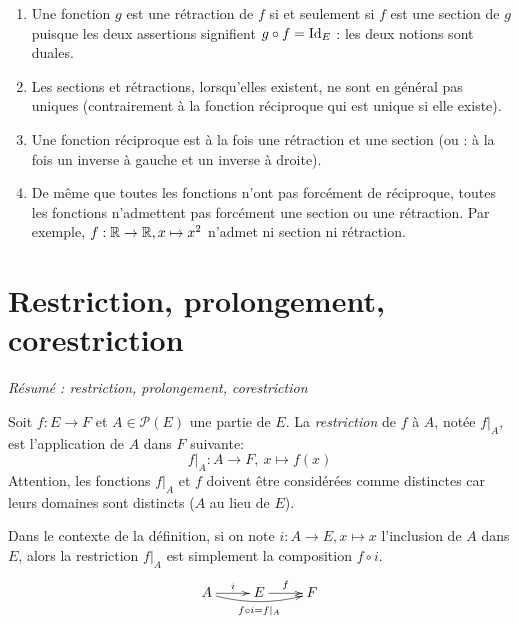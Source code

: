 \begin{remarque}
\begin{enumerate}
\item Une fonction $g$ est une rétraction de $f$ si et seulement si $f$ est une section de $g$ puisque les deux assertions signifient $g\circ f = \operatorname{Id}_E$ : les deux notions sont \og duales\fg.
\item Les sections et rétractions, lorsqu'elles existent, ne sont en général pas uniques (contrairement à la fonction réciproque qui est unique si elle existe).
\item Une fonction réciproque est à la fois une rétraction et une section (ou : à la fois un inverse à gauche et un inverse à droite).
\item De même que toutes les fonctions n'ont pas forcément de réciproque, toutes les fonctions n'admettent pas forcément une section ou une rétraction. Par exemple, $f : \mathbb{R}\to \mathbb{R}, x\mapsto x^2$ n'admet ni section ni rétraction. 
\end{enumerate}
\end{remarque}




\section{Restriction, prolongement, corestriction}

\emph{Résumé : restriction, prolongement, corestriction}

\begin{definition}[Restriction]
Soit $f : E\to F$ et $A \in \mathcal P(E)$ une partie de $E$. La \emph{restriction} de $f$ à $A$, notée $f|_{A}$, est l'application de $A$ dans $F$ suivante:
\[
f|_{A} : A\to F, \: x\mapsto f(x)
\]
Attention, les fonctions $f|_A$ et $f$ doivent être considérées comme distinctes car leurs domaines sont distincts ($A$ au lieu de $E$).
\end{definition}

\begin{remarque}
Dans le contexte de la définition, si on note $i : A\to E, x\mapsto x$ l'inclusion de $A$ dans $E$, alors la restriction $f|_A$ est simplement la composition $f\circ i$.
\[\xymatrix{
A \ar[r]^{i} \ar@/_/[rr]_{f\circ i = f|_A} & E \ar[r]^f & F
}\]
\end{remarque}

